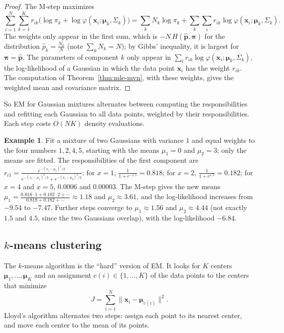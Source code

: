 \documentclass[11pt]{article}
\newcommand{\norm}[1]{\lVert #1 \rVert}
\theoremstyle{definition}
\newtheorem{example}[definition]{Example}
\theoremstyle{plain}
\theoremstyle{remark}
\begin{document}
\begin{proof}
    The M-step maximizes
    \[\sum_{i=1}^N\sum_{k=1}^K r_{ik}\big(\log\pi_k + \log\varphi(\mathbf{x}_i; \boldsymbol{\mu}_k, \Sigma_k)\big) = \sum_k N_k\log\pi_k + \sum_k\sum_i r_{ik}\log\varphi(\mathbf{x}_i; \boldsymbol{\mu}_k, \Sigma_k).\]
    The weights only appear in the first sum, which is $-N\,H(\hat{\mathbf{p}}, \boldsymbol{\pi})$ for the distribution $\hat p_k = \frac{N_k}{N}$ (note $\sum_k N_k = N$); by Gibbs' inequality, it is largest for $\boldsymbol{\pi} = \hat{\mathbf{p}}$. The parameters of component $k$ only appear in $\sum_i r_{ik}\log\varphi(\mathbf{x}_i; \boldsymbol{\mu}_k, \Sigma_k)$, the log-likelihood of a Gaussian in which the data point $\mathbf{x}_i$ has the weight $r_{ik}$. The computation of Theorem~\ref{thm:mle-mvn}, with these weights, gives the weighted mean and covariance matrix.
\end{proof}

So EM for Gaussian mixtures alternates between computing the responsibilities and refitting each Gaussian to all data points, weighted by their responsibilities. Each step costs $O(NK)$ density evaluations.

\begin{example}\label{ex:em}
    Fit a mixture of two Gaussians with variance $1$ and equal weights to the four numbers $1, 2, 4, 5$, starting with the means $\mu_1 = 0$ and $\mu_2 = 3$; only the means are fitted. The responsibilities of the first component are $r_{i1} = \frac{e^{-(x_i - \mu_1)^2/2}}{e^{-(x_i - \mu_1)^2/2} + e^{-(x_i - \mu_2)^2/2}}$: for $x = 1$, $\frac{1}{1 + e^{-1.5}} = 0.818$; for $x = 2$, $\frac{1}{1 + e^{1.5}} = 0.182$; for $x = 4$ and $x = 5$, $0.0006$ and $0.00003$. The M-step gives the new means $\mu_1 = \frac{0.818 \cdot 1 + 0.182 \cdot 2 + \cdots}{0.818 + 0.182 + \cdots} \approx 1.18$ and $\mu_2 \approx 3.61$, and the log-likelihood increases from $-9.54$ to $-7.47$. Further steps converge to $\mu_1 \approx 1.56$ and $\mu_2 \approx 4.44$ (not exactly $1.5$ and $4.5$, since the two Gaussians overlap), with the log-likelihood $-6.84$.
\end{example}

\subsection{\texorpdfstring{$k$}{k}-means clustering}

The $k$-means algorithm is the ``hard'' version of EM. It looks for $K$ centers $\boldsymbol{\mu}_1, \ldots, \boldsymbol{\mu}_K$ and an assignment $c(i) \in \{1, \ldots, K\}$ of the data points to the centers that minimize
\[J = \sum_{i=1}^N \norm{\mathbf{x}_i - \boldsymbol{\mu}_{c(i)}}^2.\]
Lloyd's algorithm alternates two steps: assign each point to its nearest center, and move each center to the mean of its points.
\end{document}
